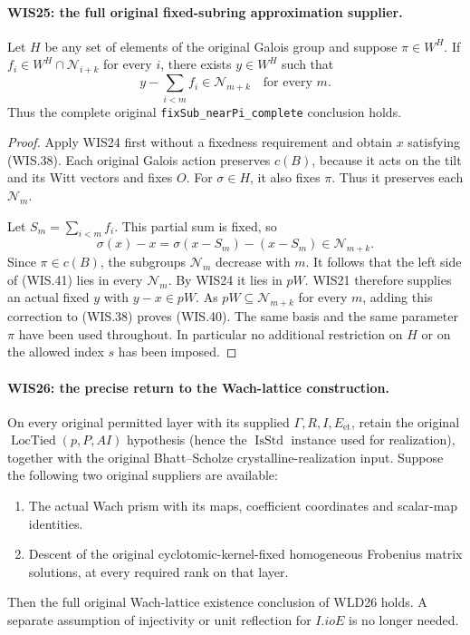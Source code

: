 \paragraph{WIS25: the full original fixed-subring approximation supplier.}
\label{claim:WIS25}
Let $H$ be any set of elements of the original Galois group
and suppose $\pi\in W^H$. If $f_i\in W^H\cap
\mathcal N_{i+k}$ for every $i$, there exists $y\in W^H$
such that
\[
                    y-\sum_{i<m}f_i\in\mathcal N_{m+k}
                               \quad\text{for every }m.  \tag{WIS.40}
\]
Thus the complete original
\texttt{fixSub\_nearPi\_complete} conclusion holds.

\begin{proof}
Apply WIS24 first without a fixedness requirement
and obtain $x$ satisfying (WIS.38). Each original
Galois action preserves $c(B)$, because it acts
on the tilt and its Witt vectors and fixes $O$.
For $\sigma\in H$, it also fixes $\pi$. Thus it
preserves each $\mathcal N_m$.

Let $S_m=\sum_{i<m}f_i$. This partial sum is fixed, so
\[
              \sigma(x)-x
                =\sigma(x-S_m)-(x-S_m)\in\mathcal N_{m+k}.
 \tag{WIS.41}
\]
Since $\pi\in c(B)$, the subgroups $\mathcal N_m$
decrease with $m$. It follows that the left side
of (WIS.41) lies in every $\mathcal N_m$.
By WIS24 it lies in $pW$. WIS21 therefore supplies
an actual fixed $y$ with $y-x\in pW$.
As $pW\subseteq\mathcal N_{m+k}$ for every $m$,
adding this correction to (WIS.38) proves (WIS.40).
The same basis and the same parameter $\pi$ have
been used throughout. In particular no additional
restriction on $H$ or on the allowed index $s$
has been imposed.
\end{proof}

\paragraph{WIS26: the precise return to the Wach-lattice construction.}
\label{claim:WIS26}
On every original permitted layer with its supplied
$\Gamma,R,I,E_{\mathrm{et}}$, retain the original
$\operatorname{LocTied}(p,P,AI)$ hypothesis (hence the
$\operatorname{IsStd}$ instance used for realization), together
with the original Bhatt--Scholze crystalline-realization input. Suppose
the following two original suppliers are available:
\begin{enumerate}
\item The actual Wach prism with its maps, coefficient
      coordinates and scalar-map identities.
\item Descent of the original cyclotomic-kernel-fixed
      homogeneous Frobenius matrix solutions, at every
      required rank on that layer.
\end{enumerate}
Then the full original Wach-lattice existence conclusion
of WLD26 holds. A separate assumption of injectivity or
unit reflection for $I.ioE$ is no longer needed.

